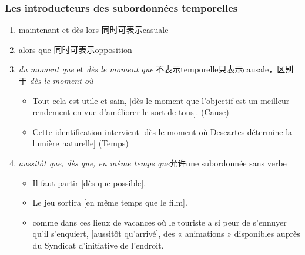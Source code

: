 \documentclass[UTF8]{report}
\begin{document}
\subsubsection{Les introducteurs des subordonnées temporelles}

\begin{enumerate}
    \item maintenant et dès lors 同时可表示casuale
    \item alors que 同时可表示opposition
    \item \textit{du moment que} et \textit{dès le moment que} 不表示temporelle只表示causale，区别于 \textit{dès le moment où }
    \begin{itemize}
        \item Tout cela est utile et sain, [dès le moment que l’objectif est un meilleur rendement en vue d’améliorer le sort de tous]. (Cause)
        \item Cette identification intervient [dès le moment où Descartes détermine la lumière naturelle] (Temps)
    \end{itemize}
    \item \textit{aussitôt que, dès que, en même temps que}允许une subordonnée sans verbe
    \begin{itemize}
        \item Il faut partir [dès que possible].
        \item Le jeu sortira [en même temps que le film].
        \item comme dans ces lieux de vacances où le touriste a si peur de s’ennuyer qu’il s’enquiert, [aussitôt qu’arrivé], des « animations » disponibles auprès du Syndicat d’initiative de l’endroit.
    \end{itemize}
\end{enumerate}
\end{document}
